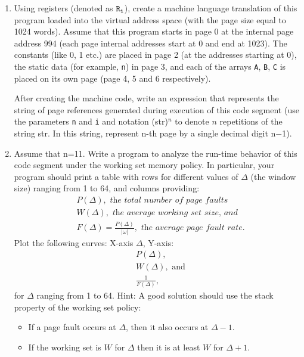 \documentclass[12pt,letterpaper]{article}
\begin{document}
\begin{enumerate}
\item Using registers (denoted as $\tt R_i$), create a machine language translation of this
program loaded into the virtual address space (with the page size equal to 1024 words).
Assume that this program starts in page 0 at the internal page address 994 (each page internal
addresses start at 0 and end at 1023). The constants (like 0, 1 etc.) are placed in page 2 (at the
addresses starting at 0), the static data (for example, {\tt n}) in page 3, and each of the arrays {\tt A}, {\tt B}, {\tt C} is placed on its own page (page 4, 5 and 6 respectively).

After creating the machine code, write an expression that represents the string of page
references generated during execution of this code segment (use the parameters {\tt n} and {\tt i} and
notation (str)$^{n}$ to denote $n$ repetitions of the string str. In this string, represent n-th page by
a single decimal digit n$-$1).

\item Assume that n=11. Write a program to analyze the run-time behavior of this
code segment under the working set memory policy. In particular, your program should print a
table with rows for different values of $\Delta$ (the window size) ranging from 1 to 64, and columns
providing:
\begin{align}
\nonumber & P(\Delta), \textit{ the total number of page faults}\\
\nonumber & W(\Delta), \textit{ the average working set size, and}\\
\nonumber & F(\Delta)=\frac{P(\Delta)}{|\omega|}, \textit{ the average page fault rate.}
\end{align}
Plot the following curves: X-axis $\Delta$, Y-axis:
\begin{align}
\nonumber & P(\Delta),\\
\nonumber & W(\Delta), \textrm{ and}\\
\nonumber & \frac{1}{F(\Delta)},
\end{align}
for $\Delta$ ranging from 1 to 64.
Hint: A good solution should use the stack property of the working set policy:
\begin{itemize}
\item If a page fault occurs at $\Delta$, then it also occurs at $\Delta-1$.
\item If the working set is $W$ for $\Delta$ then it is at least $W$ for $\Delta + 1$.
\end{itemize}


\end{enumerate}
\end{document}
